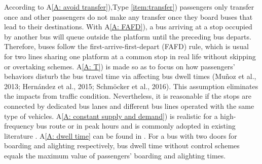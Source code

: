 \documentclass[smallextended]{svjour3}       %
\begin{document}
\begin{Abstract}
According to A\ref{A: avoid transfer}),Type \ref{item:transfer}) passengers only transfer once and other passengers do not make any transfer once they board buses that lead to their destinations.
With A\ref{A: FAFD}), a bus arriving at a stop occupied by another bus will queue outside the platform until the preceding bus departs.
Therefore, buses follow the first-arrive-first-depart (FAFD) rule, which is usual for two lines sharing one platform at a common stop in real life without skipping or overtaking schemes.
A\ref{A: T}) is made so as to focus on how passengers' behaviors disturb the bus travel time via affecting bus dwell times \citep{2014Muoz,2015Carlos,2016Sun}(Muñoz et al., 2013; Hernández et al., 2015; Schmöcker et al., 2016). This assumption eliminates the impacts from traffic condition. Nevertheless, it is reasonable if the stops are connected by dedicated bus lanes and different bus lines operated with the same type of vehicles. 
A\ref{A: constant supply and demand}) is realistic for a high-frequency bus route or in peak hours 
and is commonly adopted in existing literature \citep{2016Sanchez,2016Sun,2017Wu}.
A\ref{A: dwell time} can be found in \citep{2017Wu,2019Li,2020Wang}. For a bus with two doors for boarding and alighting respectively, bus dwell time without control schemes equals the maximum value of passengers' boarding and alighting times.




\end{Abstract}
\end{document}
